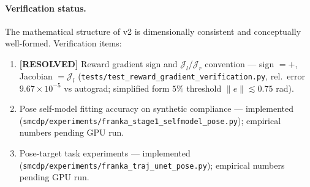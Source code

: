 \documentclass[11pt,a4paper]{article}
\begin{document}
\paragraph{Verification status.} The mathematical structure of v2 is dimensionally consistent and conceptually well-formed. Verification items:
\begin{enumerate}[leftmargin=*, noitemsep]
    \item \textbf{[RESOLVED]} Reward gradient sign and $\mathcal{J}_l$/$\mathcal{J}_r$ convention — sign $=+$, Jacobian $=\mathcal{J}_l$ (\texttt{tests/test\_reward\_gradient\_verification.py}, rel.\ error $9.67\times10^{-5}$ vs autograd; simplified form $5\%$ threshold $\|e\|\lesssim0.75$ rad).
    \item Pose self-model fitting accuracy on synthetic compliance — implemented (\texttt{smcdp/experiments/franka\_stage1\_selfmodel\_pose.py}); empirical numbers pending GPU run.
    \item Pose-target task experiments — implemented (\texttt{smcdp/experiments/franka\_traj\_unet\_pose.py}); empirical numbers pending GPU run.
\end{enumerate}
\end{document}
